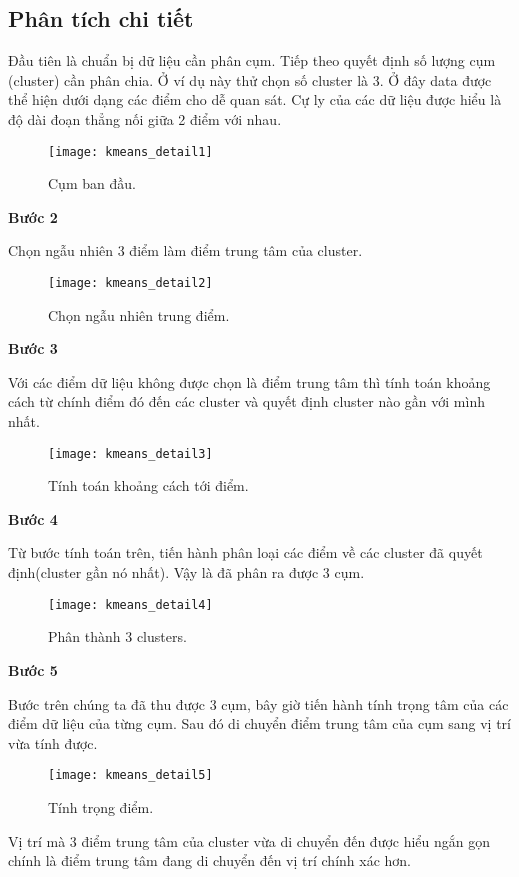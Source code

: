 \subsection{Phân tích chi tiết}
Đầu tiên là chuẩn bị dữ liệu cần phân cụm. Tiếp theo quyết định số lượng cụm (cluster) cần phân chia. Ở ví dụ này thử chọn số cluster là 3. Ở đây data được thể hiện dưới dạng các điểm cho dễ quan sát. Cự ly của các dữ liệu được hiểu là độ dài đoạn thẳng nối giữa 2 điểm với nhau.
\begin{figure}[!htbp]
    \centering
    \texttt{[image: kmeans\_detail1]}
    \caption{Cụm ban đầu.}
    \label{fig:x cubed graph}
\end{figure}
\FloatBarrier
\textbf{Bước 2}
\par
Chọn ngẫu nhiên 3 điểm làm điểm trung tâm của cluster.
\begin{figure}[!htbp]
    \centering
    \texttt{[image: kmeans\_detail2]}
    \caption{Chọn ngẫu nhiên trung điểm.}
    \label{fig:x cubed graph}
\end{figure}
\FloatBarrier
\textbf{Bước 3}
\par
Với các điểm dữ liệu không được chọn là điểm trung tâm thì tính toán khoảng cách từ chính điểm đó đến các cluster và quyết định cluster nào gần với mình nhất.
\begin{figure}[!htbp]
    \centering
    \texttt{[image: kmeans\_detail3]}
    \caption{Tính toán khoảng cách tới điểm.}
    \label{fig:x cubed graph}
\end{figure}
\FloatBarrier
\textbf{Bước 4}
\par
Từ bước tính toán trên, tiến hành phân loại các điểm về các cluster đã quyết định(cluster gần nó nhất). Vậy là đã phân ra được 3 cụm.
\begin{figure}[!htbp]
    \centering
    \texttt{[image: kmeans\_detail4]}
    \caption{Phân thành 3 clusters.}
    \label{fig:x cubed graph}
\end{figure}
\FloatBarrier
\textbf{Bước 5}
\par
Bước trên chúng ta đã thu được 3 cụm, bây giờ tiến hành tính trọng tâm của các điểm dữ liệu của từng cụm. Sau đó di chuyển điểm trung tâm của cụm sang vị trí vừa tính được.
\begin{figure}[!htbp]
    \centering
    \texttt{[image: kmeans\_detail5]}
    \caption{Tính trọng điểm.}
    \label{fig:x cubed graph}
\end{figure}
\FloatBarrier
Vị trí mà 3 điểm trung tâm của cluster vừa di chuyển đến được hiểu ngắn gọn chính là điểm trung tâm đang di chuyển đến vị trí chính xác hơn.

